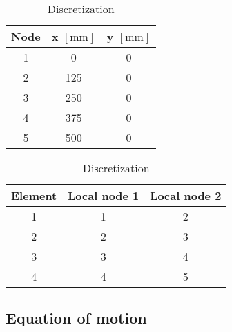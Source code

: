 \documentclass[12pt]{article}
\begin{document}
\begin{table}[H]
\label{tab:disc}
\captionsetup{justification=centering,position=top} %
\caption{Discretization} %
\begin{minipage}[t]{0.45\linewidth}
\centering
\captionsetup{justification=centering} %
\begin{tabular}{ c c c }
 Node & x $\left[ \text{mm} \right]$ & y $\left[ \text{mm} \right]$ \\
 \hline
 1 & 0 & 0 \\
 2 & 125 & 0 \\
 3 & 250 & 0 \\
 4 & 375 & 0 \\
 5 & 500 & 0 \\
\end{tabular}
\label{tab:node-coordinates}
\end{minipage}
\quad
\begin{minipage}[t]{0.45\linewidth}
\centering
\captionsetup{justification=centering} %
\begin{tabular}{ c c c }
 Element & Local node 1 & Local node 2 \\
 \hline
 1 & 1 & 2 \\
 2 & 2 & 3 \\
 3 & 3 & 4 \\
 4 & 4 & 5 \\
\end{tabular}
\vspace{0.24 cm}
\label{tab:element-connectivity}
\end{minipage}
\end{table}

\pagebreak
\subsection{Equation of motion}
\end{document}
